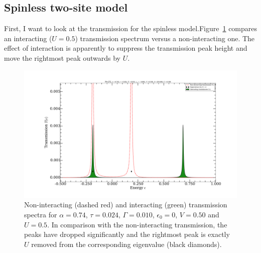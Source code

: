 \subsection{Spinless two-site model}
First, I want to look at the transmission for the spinless model.Figure~\ref{fig:spinlesstransmission} compares an interacting ($U=0.5$) transmission spectrum versus a non-interacting one. The effect of interaction is apparently to suppress the transmission peak height and move the rightmost peak outwards by $U$. 
\begin{figure}[htb]
    \centering
    \includegraphics[height=.35\textheight,clip=true,trim=5cm 2cm 4cm 3cm]{pdf/trans/perrin_two_site.pdf}
    \caption{Non-interacting (dashed red) and interacting (green) transmission spectra for $\alpha=0.74$, $\tau=0.024$, $\Gamma=0.010$, $\epsilon_0 = 0$, $V=0.50$ and $U=0.5$. In comparison with the non-interacting transmission, the peaks have dropped significantly and the rightmost peak is exactly $U$ removed from the corresponding eigenvalue (black diamonds).}
    \label{fig:spinlesstransmission}
\end{figure}

